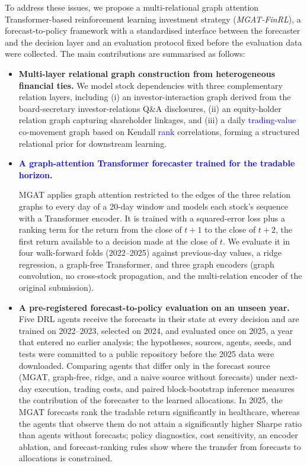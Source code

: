 \documentclass[pdflatex,sn-mathphys-num]{sn-jnl}%
\theoremstyle{thmstyleone}%
\theoremstyle{thmstyletwo}%
\theoremstyle{thmstylethree}%
\begin{document}
To address these issues, we propose a multi-relational graph attention Transformer-based reinforcement learning investment strategy (\emph{MGAT-FinRL}), a forecast-to-policy framework with a standardised interface between the forecaster and the decision layer and an evaluation protocol fixed before the evaluation data were collected.
The main contributions are summarised as follows:
\begin{itemize}

  \item \textbf{Multi-layer relational graph construction from heterogeneous financial ties.}
  We model stock dependencies with three complementary relation layers, including (i) an investor-interaction graph derived from the board-secretary investor-relations Q\&A disclosures, (ii) an equity-holder relation graph capturing shareholder linkages, and (iii) a daily \textcolor{blue}{trading-value} co-movement graph based on Kendall \textcolor{blue}{rank} correlations, forming a structured relational prior for downstream learning.

  \item \textbf{\textcolor{blue}{A graph-attention Transformer forecaster trained for the tradable horizon.}}
  {\color{blue}MGAT applies graph attention restricted to the edges of the three relation graphs to every day of a 20-day window and models each stock's sequence with a Transformer encoder. It is trained with a squared-error loss plus a ranking term for the return from the close of $t+1$ to the close of $t+2$, the first return available to a decision made at the close of $t$. We evaluate it in four walk-forward folds (2022--2025) against previous-day values, a ridge regression, a graph-free Transformer, and three graph encoders (graph convolution, no cross-stock propagation, and the multi-relation encoder of the original submission).\par}

  \item {\color{blue}\textbf{A pre-registered forecast-to-policy evaluation on an unseen year.}
  Five DRL agents receive the forecasts in their state at every decision and are trained on 2022--2023, selected on 2024, and evaluated once on 2025, a year that entered no earlier analysis; the hypotheses, sources, agents, seeds, and tests were committed to a public repository before the 2025 data were downloaded. Comparing agents that differ only in the forecast source (MGAT, graph-free, ridge, and a naive source without forecasts) under next-day execution, trading costs, and paired block-bootstrap inference measures the contribution of the forecaster to the learned allocations. In 2025, the MGAT forecasts rank the tradable return significantly in healthcare, whereas the agents that observe them do not attain a significantly higher Sharpe ratio than agents without forecasts; policy diagnostics, cost sensitivity, an encoder ablation, and forecast-ranking rules show where the transfer from forecasts to allocations is constrained.\par}
\end{itemize}
\end{document}
